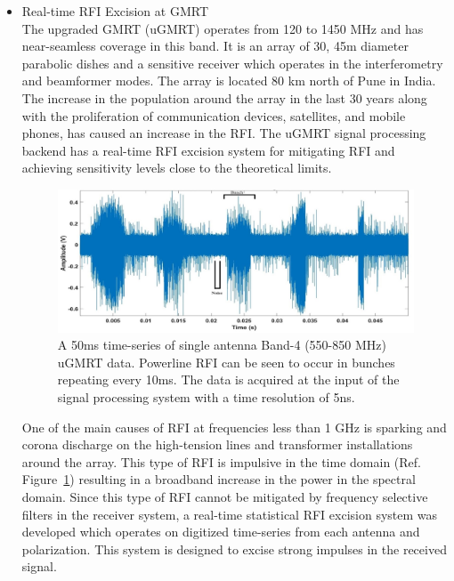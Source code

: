 \begin{itemize}
\item Real-time RFI Excision at GMRT\\

The upgraded GMRT (uGMRT) \citep{gupta2017upgraded} operates from 120 to 1450 MHz and has near-seamless coverage in this band. It is an array of 30, 45m diameter parabolic dishes and a sensitive receiver which operates in the interferometry and beamformer modes. The array is located 80 km north of Pune in India. The increase in the population around the array in the last 30 years along with the proliferation of communication devices, satellites, and mobile phones, has caused an increase in the RFI. The uGMRT signal processing backend has a real-time RFI excision system for mitigating RFI and achieving sensitivity levels close to the theoretical limits.

\begin{figure}
    \centering
    \includegraphics[scale=0.7]{Hardware Excision Techniques/figures/Band4_timeseries_ed.jpg}
    \caption{A 50ms time-series of single antenna Band-4 (550-850 MHz) uGMRT data. Powerline RFI can be seen to occur in bunches repeating every 10ms. The data is acquired at the input of the signal processing system with a time resolution of 5ns.}
    \label{fig:ugmrt-b4-ts}
\end{figure}

One of the main causes of RFI at frequencies less than 1 GHz is sparking and corona discharge on the high-tension lines and transformer installations around the array. This type of RFI is impulsive in the time domain (Ref. Figure~\ref{fig:ugmrt-b4-ts}) resulting in a broadband increase in the power in the spectral domain. Since this type of RFI cannot be mitigated by frequency selective filters in the receiver system, a real-time statistical RFI excision system was developed which operates on digitized time-series from each antenna and polarization. This system is designed to excise strong impulses in the received signal.


\end{itemize}
